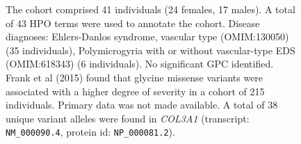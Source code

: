 \begin{figure}[htbp]
    \vspace{2em}
    
    \caption{ The cohort comprised 41 individuals (24 females, 17 males). A total of 43 HPO terms were used to annotate the cohort. Disease diagnoses: Ehlers-Danlos syndrome, vascular type (OMIM:130050) (35 individuals), Polymicrogyria with or without vascular-type EDS (OMIM:618343) (6 individuals). No significant GPC identified. Frank et al (2015) found that glycine missense variants were associated with a higher degree of severity in a cohort of 215 individuals. Primary data was not made available. A total of 38 unique variant alleles were found in \textit{COL3A1} (transcript: \texttt{NM\_000090.4}, protein id: \texttt{NP\_000081.2}).}
    \end{figure}
    